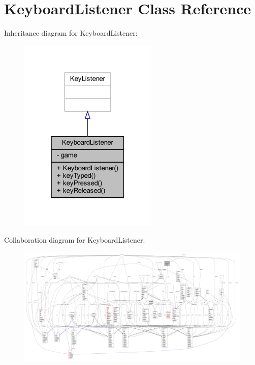 \hypertarget{classinputs_1_1_keyboard_listener}{}\section{Keyboard\+Listener Class Reference}
\label{classinputs_1_1_keyboard_listener}


Inheritance diagram for Keyboard\+Listener\+:\nopagebreak
\begin{figure}[H]
\begin{center}
\leavevmode
\includegraphics[width=187pt]{classinputs_1_1_keyboard_listener__inherit__graph}
\end{center}
\end{figure}


Collaboration diagram for Keyboard\+Listener\+:
\nopagebreak
\begin{figure}[H]
\begin{center}
\leavevmode
\includegraphics[width=350pt]{classinputs_1_1_keyboard_listener__coll__graph}
\end{center}
\end{figure}
